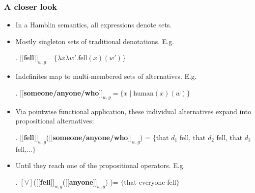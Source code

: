 \documentclass{beamer}
\newcommand\notext[1]{}
\newcommand{\bit}{\begin{itemize}}
\newcommand{\eit}{\end{itemize}}
\newcommand{\lin}{\ensuremath{\lbrack\!\lbrack}}
\newcommand{\rin}{\ensuremath{\rbrack\!\rbrack}}
\begin{document}
\frame
{\frametitle{A closer look}
\bit
\notext{\pause} \item In a Hamblin semantics,  all expressions denote sets.

\notext{\pause} \item Mostly singleton sets of traditional
denotations. E.g.

\ex. $\lin${\bf  fell}$\rin_{w,g}$= $\{\lambda x \lambda w'.   ${\sc fell}$(x)(w')\}$ 

\notext{\pause} \item Indefinites map to  multi-membered sets of alternatives. E.g.

\ex.  $\lin ${\bf someone/anyone/who}$ \rin_{w,g}= \{x \mid ${\sc human}$(x)(w)\}$ 

  \notext{\pause} \item  Via pointwise
functional application, these individual alternatives  expand into    propositional alternatives:

\ex.  $\lin ${\bf fell}$\rin_{w,g}$($\lin ${\bf someone/anyone/who}$\rin_{w,g}$) =   $\{$that $d_1$ fell, that $d_2$ fell, that $d_3$ fell,...$\}$ 

\notext{\pause} \item Until they reach one of the propositional operators. E.g.%


\ex. $ [\forall]$($\lin${\bf fell}$\rin_{w,g}$($\lin ${\bf anyone}$\rin_{w,g}$) )=   $\{$that everyone fell$\}$ 


 \notext{\ees{\item $\lin ${\it A  woman fell}$\rin_{w,g}$ =  [$\exists$] ($\{$that $d_1$ fell, that $d_2$ fell,...$\}$)

\item $\lin ${\it Which  woman fell}$\rin_{w,g}$ =  [Q] ($\{$that $d_1$ fell, that $d_2$ fell, that $d_3$ fell,...$\}$)
\item ...}
 }

\eit }
\end{document}
